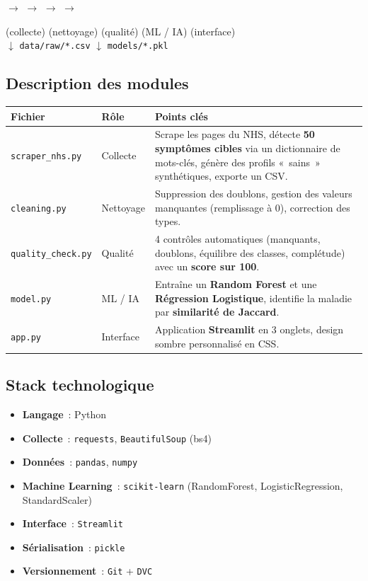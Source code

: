\documentclass[11pt,a4paper]{article}
\begin{document}
\begin{center}
 $\rightarrow$
 $\rightarrow$
 $\rightarrow$
 $\rightarrow$
\end{center}

\begin{center}
\small (collecte) \quad (nettoyage) \quad (qualité) \quad (ML / IA) \quad (interface)\\
$\downarrow$ \texttt{data/raw/*.csv} \hspace{4cm} $\downarrow$ \texttt{models/*.pkl}
\end{center}

\subsection{Description des modules}

\begin{longtable}{@{}p{3cm} p{3cm} p{8cm}@{}}
\toprule
\textbf{Fichier} & \textbf{Rôle} & \textbf{Points clés} \\
\midrule
\endhead
\texttt{scraper\_nhs.py} & Collecte & Scrape les pages du NHS, détecte \textbf{50 symptômes cibles} via un dictionnaire de mots-clés, génère des profils «~sains~» synthétiques, exporte un CSV. \\
\texttt{cleaning.py} & Nettoyage & Suppression des doublons, gestion des valeurs manquantes (remplissage à 0), correction des types. \\
\texttt{quality\_check.py} & Qualité & 4 contrôles automatiques (manquants, doublons, équilibre des classes, complétude) avec un \textbf{score sur 100}. \\
\texttt{model.py} & ML / IA & Entraîne un \textbf{Random Forest} et une \textbf{Régression Logistique}, identifie la maladie par \textbf{similarité de Jaccard}. \\
\texttt{app.py} & Interface & Application \textbf{Streamlit} en 3 onglets, design sombre personnalisé en CSS. \\
\bottomrule
\end{longtable}

\subsection{Stack technologique}
\begin{itemize}
  \item \textbf{Langage}~: Python
  \item \textbf{Collecte}~: \texttt{requests}, \texttt{BeautifulSoup} (bs4)
  \item \textbf{Données}~: \texttt{pandas}, \texttt{numpy}
  \item \textbf{Machine Learning}~: \texttt{scikit-learn} (RandomForest, LogisticRegression, StandardScaler)
  \item \textbf{Interface}~: \texttt{Streamlit}
  \item \textbf{Sérialisation}~: \texttt{pickle}
  \item \textbf{Versionnement}~: \texttt{Git} + \texttt{DVC}
\end{itemize}
\end{document}
